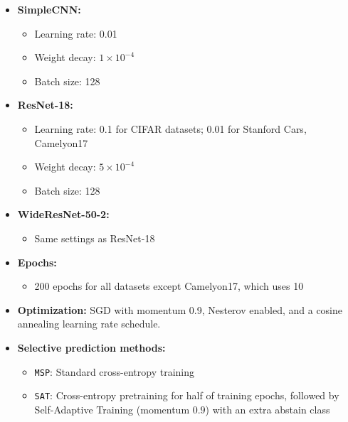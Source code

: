 \begin{itemize}[leftmargin=1em]
    \item \textbf{SimpleCNN:}
    \begin{itemize}[leftmargin=1em]
        \item Learning rate: 0.01
        \item Weight decay: \(1\times10^{-4}\)
        \item Batch size: 128 %
    \end{itemize}

    \item \textbf{ResNet-18:}
    \begin{itemize}[leftmargin=1em]
        \item Learning rate: 0.1 for CIFAR datasets; 0.01 for Stanford Cars, Camelyon17%
        \item Weight decay: \(5\times10^{-4}\)
        \item Batch size: 128 %
    \end{itemize}

    \item \textbf{WideResNet-50-2:}
    \begin{itemize}[leftmargin=1em]
        \item Same settings as ResNet-18
    \end{itemize}

    \item \textbf{Epochs:}
    \begin{itemize}[leftmargin=1em]
        \item 200 epochs for all datasets except Camelyon17, which uses 10
    \end{itemize}

    \item \textbf{Optimization:} SGD with momentum 0.9, Nesterov enabled, and a cosine annealing learning rate schedule.

    \item \textbf{Selective prediction methods:}
    \begin{itemize}[leftmargin=1em]
        \item \texttt{MSP}: Standard cross-entropy training
        \item \texttt{SAT}: Cross-entropy pretraining for half of training epochs, followed by Self-Adaptive Training (momentum \(0.9\)) with an extra abstain class
    \end{itemize}
\end{itemize}

